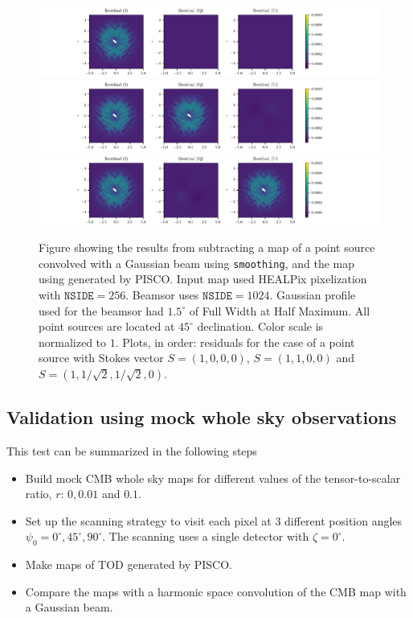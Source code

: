\documentclass[a4paper,11pt]{article}
\begin{document}
\begin{figure}
	\centering
	\includegraphics[width=1.0\linewidth]{figures/stokes_I_source_256_beam_1024_dec_45.pdf}
	\includegraphics[width=1.0\linewidth]{figures/stokes_Q_source_256_beam_1024_dec_45.pdf}
	\includegraphics[width=1.0\linewidth]{figures/stokes_U_source_256_beam_1024_dec_45.pdf}
	\caption{Figure showing the results from subtracting a map of a point source convolved with a Gaussian beam using \texttt{smoothing}, and the map using generated by PISCO. Input map used HEALPix pixelization with $\mathrm{\texttt{NSIDE}} = 256$. Beamsor uses $\mathrm{\texttt{NSIDE}} = 1024$. Gaussian profile used for the beamsor had $1.5^\circ$ of Full Width at Half Maximum. All point sources are located at $45^\circ$ declination. Color scale is normalized to $1$. Plots, in order: residuals for the case of a point source with Stokes vector $S = (1,0,0,0)$, $S=(1,1,0,0)$ and $S=(1,1/\sqrt{2},1/\sqrt{2},0)$. }
	\label{fig::stokesqsource256beam1024dec45}
\end{figure}

\subsection{Validation using mock whole sky observations}
\label{sec::val_sky}
This test can be summarized in the following steps

\begin{itemize}
	\item Build mock CMB whole sky maps for different values of the tensor-to-scalar ratio, $r$: $0, 0.01$ and $0.1$.
	\item Set up the scanning strategy to visit each pixel at 3 different position angles $\psi_0 = 0^{\circ},45^{\circ},90^{\circ}$. The scanning uses a single detector with $\zeta=0^\circ$.
	\item Make maps of TOD generated by PISCO. 
	\item Compare the maps with a harmonic space convolution of the CMB map with a Gaussian beam.
\end{itemize}
\end{document}

